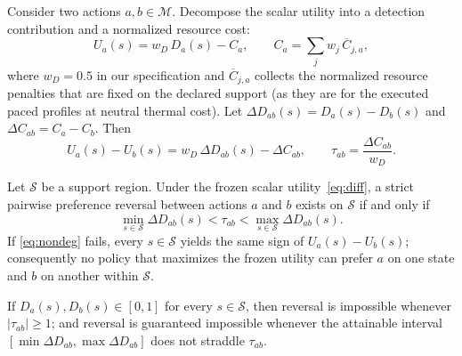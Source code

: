 Consider two actions $a,b\in\mathcal M$. Decompose the scalar utility into a detection contribution and a normalized resource cost:
\begin{equation}
    U_a(s) = w_D\, D_a(s) - C_a,\qquad C_a=\sum_j w_j\,\overline C_{j,a},
\end{equation}
where $w_D=0.5$ in our specification and $\overline C_{j,a}$ collects the normalized resource penalties that are fixed on the declared support (as they are for the executed paced profiles at neutral thermal cost). Let $\Delta D_{ab}(s)=D_a(s)-D_b(s)$ and $\Delta C_{ab}=C_a-C_b$. Then
\begin{equation}\label{eq:diff}
    U_a(s)-U_b(s) = w_D\,\Delta D_{ab}(s) - \Delta C_{ab},\qquad
    \tau_{ab}=\frac{\Delta C_{ab}}{w_D}.
\end{equation}

\begin{theorem}\label{thm:nondeg}
Let $\mathcal S$ be a support region. Under the frozen scalar utility~\eqref{eq:diff}, a strict pairwise preference reversal between actions $a$ and $b$ exists on $\mathcal S$ if and only if
\begin{equation}\label{eq:nondeg}
    \min_{s\in\mathcal S}\Delta D_{ab}(s) < \tau_{ab} < \max_{s\in\mathcal S}\Delta D_{ab}(s).
\end{equation}
If \eqref{eq:nondeg} fails, every $s\in\mathcal S$ yields the same sign of $U_a(s)-U_b(s)$; consequently no policy that maximizes the frozen utility can prefer $a$ on one state and $b$ on another within $\mathcal S$.
\end{theorem}

\begin{corollary}\label{cor:bound}
If $D_a(s),D_b(s)\in[0,1]$ for every $s\in\mathcal S$, then reversal is impossible whenever $|\tau_{ab}|\ge 1$; and reversal is guaranteed impossible whenever the attainable interval $[\min\Delta D_{ab},\max\Delta D_{ab}]$ does not straddle $\tau_{ab}$.
\end{corollary}

